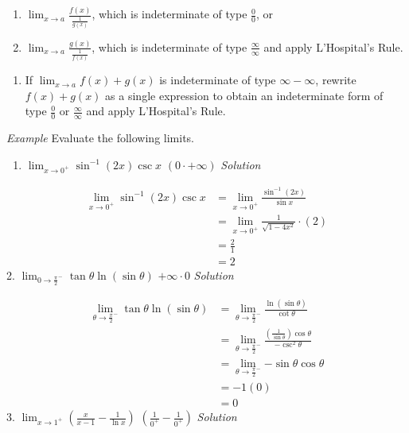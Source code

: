 \documentclass[
  letterpaper,
  DIV=11,
  numbers=noendperiod]{scrartcl}
\providecommand{\tightlist}{%
  \setlength{\itemsep}{0pt}\setlength{\parskip}{0pt}}\usepackage{longtable,booktabs,array}
\theoremstyle{definition}
\theoremstyle{plain}
\theoremstyle{remark}
\begin{document}
\begin{enumerate}
\def\labelenumi{(\alph{enumi})}
\tightlist
\item
  \(\displaystyle\lim_{x\to a}{\frac{f(x)}{\frac{1}{g(x)}}}\), which is
  indeterminate of type \(\frac{0}{0}\), or
\item
  \(\displaystyle\lim_{x\to a}{\frac{g(x)}{\frac{1}{f(x)}}}\), which is
  indeterminate of type \(\frac{\infty}{\infty}\) and apply L'Hospital's
  Rule.
\end{enumerate}

\begin{enumerate}
\def\labelenumi{\arabic{enumi}.}
\setcounter{enumi}{1}
\tightlist
\item
  If \(\displaystyle\lim_{x\to a}{f(x)+g(x)}\) is indeterminate of type
  \(\infty - \infty\), rewrite \(f(x)+g(x)\) as a single expression to
  obtain an indeterminate form of type \(\frac{0}{0}\) or
  \(\frac{\infty}{\infty}\) and apply L'Hospital's Rule.
\end{enumerate}

\leavevmode{}%
\emph{Example} Evaluate the following limits.

\begin{enumerate}
\def\labelenumi{\arabic{enumi}.}
\tightlist
\item
  \(\displaystyle\lim_{x\to 0^+}{\sin^{-1} (2x) \csc x}\)
  \((0\cdot +\infty)\) \emph{Solution}
\end{enumerate}

\[
\begin{aligned}
\displaystyle\lim_{x\to 0^+}{\sin^{-1} (2x) \csc x} &=\displaystyle\lim_{x\to 0^+}{\frac{\sin^{-1} (2x)}{\sin x}}\\&=\displaystyle\lim_{x\to 0^+}{\frac{1}{\sqrt{1-4x^2}}}\cdot (2) \\&=\frac{2}{1}\\&=2
\end{aligned}
\] 2.
\(\displaystyle\lim_{0\to \frac{\pi}{2}^-}{\tan \theta \ln (\sin \theta)}\)
\(+\infty \cdot 0\) \emph{Solution}

\[
\begin{aligned}
\displaystyle\lim_{\theta\to \frac{\pi}{2}^-}{\tan \theta \ln (\sin \theta)}&=\displaystyle\lim_{\theta \to \frac{\pi}{2}^-}{\frac {\ln (\sin \theta)}{\cot \theta}}\\&=\displaystyle\lim_{\theta\to \frac{\pi}{2}^-}{\frac{\left(\frac {1}{\sin \theta}\right)\cos \theta}{-\csc^2 \theta}}\\&=\displaystyle\lim_{\theta\to \frac{\pi}{2}^-}{-\sin \theta\cos \theta}\\&=-1(0)\\&=0
\end{aligned}
\] 3.
\(\displaystyle\lim_{x\to 1^+}{\left(\frac{x}{x-1}-\frac{1}{\ln x}\right)}\)
\(\left(\frac{1}{0^+}-\frac{1}{0^+}\right)\) \emph{Solution}
\end{document}
